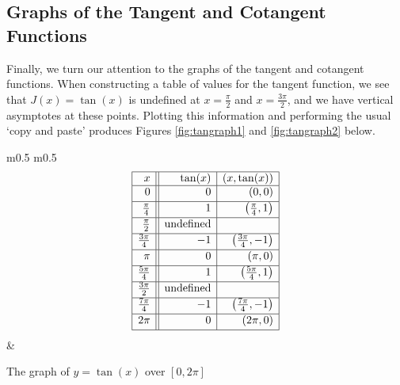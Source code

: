 \subsection{Graphs of the Tangent and Cotangent Functions}

Finally, we turn our attention to the graphs of the tangent and cotangent functions.  When constructing a table of values for the tangent function, we see that $J(x) = \tan(x)$ is undefined at $x  = \frac{\pi}{2}$ and $x = \frac{3\pi}{2}$, and we have vertical asymptotes at these points.  Plotting this information and performing the usual `copy and paste' produces Figures \ref{fig:tangraph1} and \ref{fig:tangraph2} below. 

\medskip

\noindent\hskip-10pt\begin{minipage}{\textwidth}
\begin{center}
\begin{tabular}{ m{} m{}}
\setlength{\extrarowheight}{2pt}
\[ \begin{array}{|r||r|r|}  

\hline

 x & \tan(x) & (x,\tan(x)) \\ \hline
0  & 0 & (0, 0) \\ [2pt]   \hline
\frac{\pi}{4}  & 1 & \left(\frac{\pi}{4},1 \right) \\ [2pt] \hline 
\frac{\pi}{2}  & \text{undefined} &  \\ [2pt] \hline 
\frac{3\pi}{4}  & -1 & \left(\frac{3\pi}{4}, -1\right) \\ [2pt] \hline 
\pi & 0 & (\pi, 0) \\ [2pt] \hline 
\frac{5\pi}{4}  & 1 & \left(\frac{5\pi}{4}, 1 \right) \\ [2pt] \hline 
\frac{3\pi}{2}  & \text{undefined} &  \\ [2pt] \hline 
\frac{7\pi}{4}  & -1 & \left(\frac{7\pi}{4}, -1 \right) \\ [2pt] \hline 
2\pi  & 0 & (2\pi, 0) \\  [2pt] \hline
\end{array} \]  \setlength{\extrarowheight}{0pt} & 

\end{tabular}
\end{center}
\captionsetup{type=figure}
\caption{The graph of $y = \tan(x)$ over $[0,2\pi]$}\label{fig:tangraph1}
\end{minipage}


